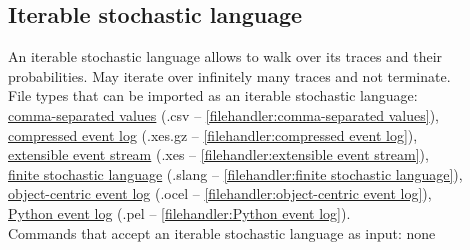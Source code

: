 {\subsection{Iterable stochastic language}
\label{trait:iterable stochastic language}
An iterable stochastic language allows to walk over its traces and their probabilities. May iterate over infinitely many traces and not terminate.
\\File types that can be imported as an iterable stochastic language: \\\null\qquad\hyperref[filehandler:comma-separated values]{comma-separated values} (.csv -- \cref{filehandler:comma-separated values}), \\\null\qquad\hyperref[filehandler:compressed event log]{compressed event log} (.xes.gz -- \cref{filehandler:compressed event log}), \\\null\qquad\hyperref[filehandler:extensible event stream]{extensible event stream} (.xes -- \cref{filehandler:extensible event stream}), \\\null\qquad\hyperref[filehandler:finite stochastic language]{finite stochastic language} (.slang -- \cref{filehandler:finite stochastic language}), \\\null\qquad\hyperref[filehandler:object-centric event log]{object-centric event log} (.ocel -- \cref{filehandler:object-centric event log}), \\\null\qquad\hyperref[filehandler:Python event log]{Python event log} (.pel -- \cref{filehandler:Python event log}).
\\Commands that accept an iterable stochastic language as input: none
}
